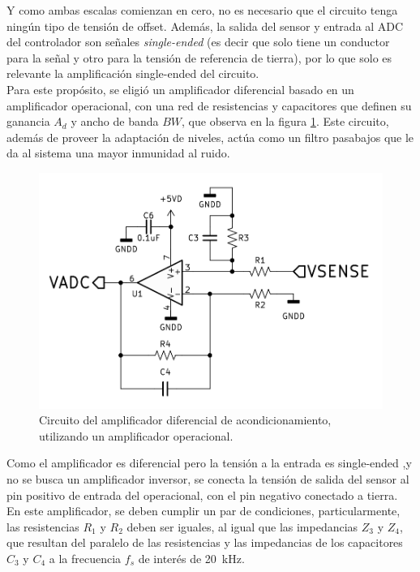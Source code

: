 Y como ambas escalas comienzan en cero, no es necesario que el circuito tenga ningún tipo de tensión de offset. Además, la salida del sensor y entrada al ADC del controlador son señales {\Medium \textit{single-ended}} (es decir que solo tiene un conductor para la señal y otro para la tensión de referencia de tierra), por lo que solo es relevante la amplificación single-ended del circuito.\\

Para este propósito, se eligió un {\Medium amplificador diferencial} basado en un amplificador operacional, con una red de resistencias y capacitores que definen su ganancia $A_d$ y ancho de banda $BW$, que observa en la figura \ref{circuito_acond}. Este circuito, además de proveer la adaptación de niveles, actúa como un filtro pasabajos que le da al sistema una mayor inmunidad al ruido.\\

\begin{figure}[h]
    \centering
    \includegraphics[scale=1.2]{Imagenes/Acondicionamiento.png}
    \caption{Circuito del amplificador diferencial de acondicionamiento, utilizando un amplificador operacional.}
    \label{circuito_acond}
\end{figure}

Como el amplificador es diferencial pero la tensión a la entrada es single-ended ,y no se busca un amplificador inversor, se conecta la tensión de salida del sensor al pin positivo de entrada del operacional, con el pin negativo conectado a tierra. En este amplificador, se deben cumplir un par de condiciones, particularmente, las resistencias $R_1$ y $R_2$ deben ser iguales, al igual que las impedancias $Z_3$ y $Z_4$, que resultan del paralelo de las resistencias y las impedancias de los capacitores $C_3$ y $C_4$ a la frecuencia $f_s$ de interés de \SI[]{20}[]{\kilo\hertz}.\\

